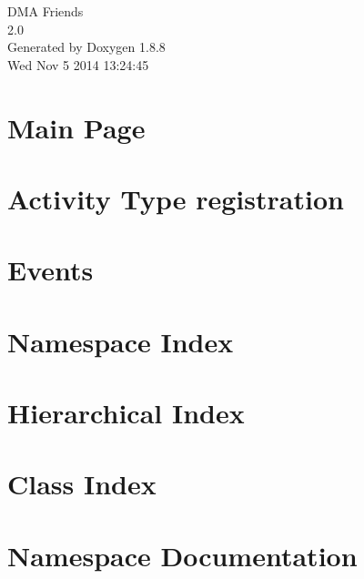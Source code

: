 \documentclass[twoside]{book}
\newcommand{\+}{\discretionary{\mbox{\scriptsize$\hookleftarrow$}}{}{}}
\newcommand{\clearemptydoublepage}{%
  \newpage{\pagestyle{empty}\cleardoublepage}%
}
\begin{document}
\hypersetup{pageanchor=false,
             bookmarks=true,
             bookmarksnumbered=true,
             pdfencoding=unicode
            }
\begin{titlepage}
\vspace*{7cm}
\begin{center}%
{\Large D\+M\+A Friends \\[1ex]\large 2.\+0 }\\
\vspace*{1cm}
{\large Generated by Doxygen 1.8.8}\\
\vspace*{0.5cm}
{\small Wed Nov 5 2014 13:24:45}\\
\end{center}
\end{titlepage}
\clearemptydoublepage
\tableofcontents
\clearemptydoublepage
{}
\hypersetup{pageanchor=true}

\chapter{Main Page}
\label{index}\hypertarget{index}{}
\chapter{Activity Type registration}
\label{df/d06/md_docs_ACTIVITY-TYPES}
\hypertarget{df/d06/md_docs_ACTIVITY-TYPES}{}

\chapter{Events}
\label{df/d0e/md_docs_EVENTS}
\hypertarget{df/d0e/md_docs_EVENTS}{}

\chapter{Namespace Index}

\chapter{Hierarchical Index}

\chapter{Class Index}

\chapter{Namespace Documentation}



\end{document}
